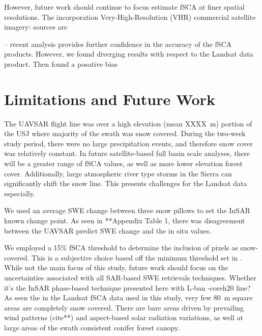 However, future work should continue to focus estimate fSCA at finer spatial resolutions. The incorporation Very-High-Resolution (VHR) commercial satellite imagery: sources are \citep{huImprovingMountainSnow2022, thalerEstimatingSnowCover2023,yangHighresolutionMappingSnow2023,johnHighResolutionSnowCoveredArea2022}


-- \cite{stillingerLandsatMODISVIIRS2023} recent analysis provides further confidence in the accuracy of the fSCA products. However, we found diverging results with respect to the Landsat data product. Then found a posative bias 

\hypertarget{ch5-discussion-2}{\section{Limitations and Future Work}\label{ch4-discussion-2}}

The UAVSAR flight line was over a high elevation (mean XXXX~m) portion of the USJ where majority of the swath was snow covered. During the two-week study period, there were no large precipitation events, and therefore snow cover was relatively constant. In future satellite-based full basin scale analyses, there will be a greater range of fSCA values, as well as more lower elevation forest cover. Additionally, large atmospheric river type storms in the Sierra can significantly shift the snow line. This presents challenges for the Landsat data especially.

We used an average SWE change between three snow pillows to set the InSAR known change point. As seen in **Appendix Table 1, there was disagreement between the UAVSAR predict SWE change and the in situ values. 



We employed a 15\% fSCA threshold to determine the inclusion of pixels as snow-covered. This is a subjective choice based off the minimum threshold set in \cite{painterRetrievalSubpixelSnow2009}. While not the main focus of this study, future work should focus on the uncertainties associated with all SAR-based SWE retrievals techniques. Whether it's the InSAR phase-based technique presented here with L-ban 
-coreh20 line?
As seen the in the Landsat fSCA data used in this study, very few 80~m square areas are completely snow covered. There are bare areas driven by prevailing wind patterns (cite**) and aspect-based solar radiation variations, as well at large areas of the swath consistent conifer forest canopy.



